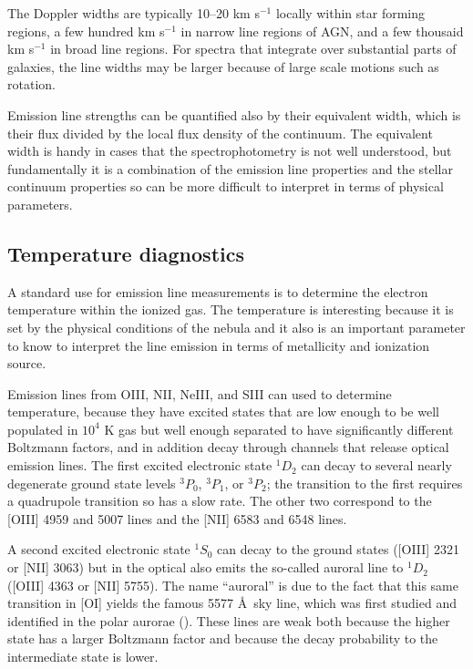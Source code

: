 The Doppler widths are typically 10--20 km s$^{-1}$ locally within
star forming regions, a few hundred km s$^{-1}$ in narrow line regions
of AGN, and a few thousaid km s$^{-1}$ in broad line regions. For
spectra that integrate over substantial parts of galaxies, the line
widths may be larger because of large scale motions such as rotation.

Emission line strengths can be quantified also by their equivalent
width, which is their flux divided by the local flux density of the
continuum. The equivalent width is handy in cases that the
spectrophotometry is not well understood, but fundamentally it is a
combination of the emission line properties and the stellar continuum
properties so can be more difficult to interpret in terms of physical
parameters.

\subsection{Temperature diagnostics}

A standard use for emission line measurements is to determine the
electron temperature within the ionized gas. The temperature is
interesting because it is set by the physical conditions of the nebula
and it also is an important parameter to know to interpret the line
emission in terms of metallicity and ionization source.

Emission lines from OIII, NII, NeIII, and SIII can used to determine
temperature, because they have excited states that are low enough to
be well populated in $10^4$ K gas but well enough separated to have
significantly different Boltzmann factors, and in addition decay
through channels that release optical emission lines. The first
excited electronic state ${}^{1}D_2$ can decay to several nearly
degenerate ground state levels ${}^3P_0$, ${}^3P_1$, or ${}^3P_2$; the
transition to the first requires a quadrupole transition so has a slow
rate. The other two correspond to the [OIII] 4959 and 5007 lines and
the [NII] 6583 and 6548 lines.

A second excited electronic state ${}^1S_0$ can decay to the ground
states ([OIII] 2321 or [NII] 3063) but in the optical also emits the
so-called auroral line to ${}^1D_2$ ([OIII] 4363 or [NII] 5755). The
name ``auroral'' is due to the fact that this same transition in [OI]
yields the famous 5577 \AA\ sky line, which was first studied and
identified in the polar aurorae (\citealt{mclennan28a,
kragh09a}). These lines are weak both because the higher state has a
larger Boltzmann factor and because the decay probability to the
intermediate state is lower.

